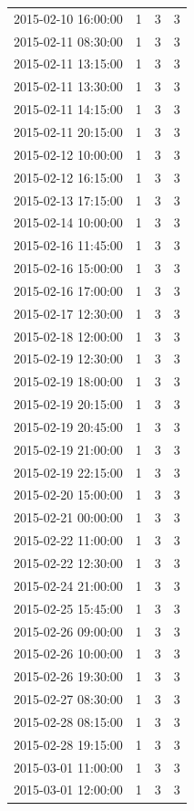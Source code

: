 \begin{tabular}{lrrr}
2015-02-10 16:00:00 & 1 & 3 & 3 \\
2015-02-11 08:30:00 & 1 & 3 & 3 \\
2015-02-11 13:15:00 & 1 & 3 & 3 \\
2015-02-11 13:30:00 & 1 & 3 & 3 \\
2015-02-11 14:15:00 & 1 & 3 & 3 \\
2015-02-11 20:15:00 & 1 & 3 & 3 \\
2015-02-12 10:00:00 & 1 & 3 & 3 \\
2015-02-12 16:15:00 & 1 & 3 & 3 \\
2015-02-13 17:15:00 & 1 & 3 & 3 \\
2015-02-14 10:00:00 & 1 & 3 & 3 \\
2015-02-16 11:45:00 & 1 & 3 & 3 \\
2015-02-16 15:00:00 & 1 & 3 & 3 \\
2015-02-16 17:00:00 & 1 & 3 & 3 \\
2015-02-17 12:30:00 & 1 & 3 & 3 \\
2015-02-18 12:00:00 & 1 & 3 & 3 \\
2015-02-19 12:30:00 & 1 & 3 & 3 \\
2015-02-19 18:00:00 & 1 & 3 & 3 \\
2015-02-19 20:15:00 & 1 & 3 & 3 \\
2015-02-19 20:45:00 & 1 & 3 & 3 \\
2015-02-19 21:00:00 & 1 & 3 & 3 \\
2015-02-19 22:15:00 & 1 & 3 & 3 \\
2015-02-20 15:00:00 & 1 & 3 & 3 \\
2015-02-21 00:00:00 & 1 & 3 & 3 \\
2015-02-22 11:00:00 & 1 & 3 & 3 \\
2015-02-22 12:30:00 & 1 & 3 & 3 \\
2015-02-24 21:00:00 & 1 & 3 & 3 \\
2015-02-25 15:45:00 & 1 & 3 & 3 \\
2015-02-26 09:00:00 & 1 & 3 & 3 \\
2015-02-26 10:00:00 & 1 & 3 & 3 \\
2015-02-26 19:30:00 & 1 & 3 & 3 \\
2015-02-27 08:30:00 & 1 & 3 & 3 \\
2015-02-28 08:15:00 & 1 & 3 & 3 \\
2015-02-28 19:15:00 & 1 & 3 & 3 \\
2015-03-01 11:00:00 & 1 & 3 & 3 \\
2015-03-01 12:00:00 & 1 & 3 & 3 \\

\end{tabular}
